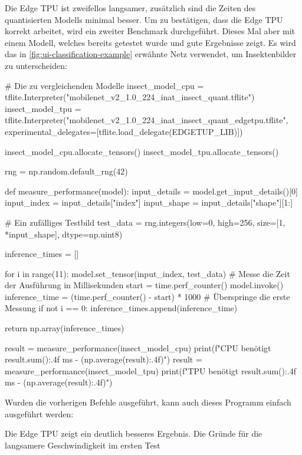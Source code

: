 \noindent
Die Edge TPU ist zweifellos langsamer, zusätzlich
sind die Zeiten des quantisierten Modells minimal besser.
Um zu bestätigen, dass die Edge TPU korrekt arbeitet,
wird ein zweiter Benchmark durchgeführt.
Dieses Mal aber mit einem Modell,
welches bereits getestet wurde und gute Ergebnisse zeigt.
Es wird das in \autoref{fig:ui-classification-example}
erwähnte Netz verwendet, um Insektenbilder zu unterscheiden:
\begin{pythoncode}
# Die zu vergleichenden Modelle
insect_model_cpu = tflite.Interpreter("mobilenet_v2_1.0_224_inat_insect_quant.tflite")
insect_model_tpu = tflite.Interpreter("mobilenet_v2_1.0_224_inat_insect_quant_edgetpu.tflite",
    experimental_delegates=[tflite.load_delegate(EDGETUP_LIB)])

insect_model_cpu.allocate_tensors()
insect_model_tpu.allocate_tensors()

rng = np.random.default_rng(42)

def measure_performance(model):
    input_details = model.get_input_details()[0]
    input_index = input_details["index"]
    input_shape = input_details["shape"][1:]

    # Ein zufälliges Testbild
    test_data = rng.integers(low=0, high=256, size=[1, *input_shape], dtype=np.uint8)

    inference_times = []

    for i in range(11):
        model.set_tensor(input_index, test_data)
        # Messe die Zeit der Ausführung in Millisekunden
        start = time.perf_counter()
        model.invoke()
        inference_time = (time.perf_counter() - start) * 1000
        # Überspringe die erste Messung
        if not i == 0:
            inference_times.append(inference_time)

    return np.array(inference_times)

result = measure_performance(insect_model_cpu)
print(f"CPU benötigt {result.sum():.4f} ms - ({np.average(result):.4f})")
result = measure_performance(insect_model_tpu)
print(f"TPU benötigt {result.sum():.4f} ms - ({np.average(result):.4f})")
\end{pythoncode}
Wurden die vorherigen Befehle ausgeführt,
kann auch dieses Programm einfach ausgeführt werden:
Die Edge TPU zeigt ein deutlich besseres Ergebnis.
Die Gründe für die langsamere Geschwindigkeit im ersten Test
